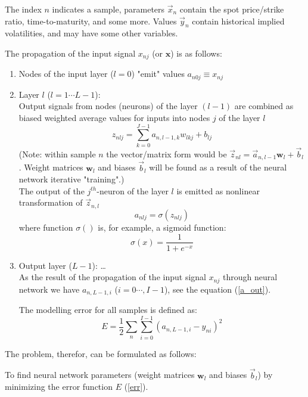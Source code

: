 \documentclass[10pt]{article}
\begin{document}
The index $n$ indicates a sample, parameters $\vec x_n$ contain the spot price/strike ratio, time-to-maturity, and some more. Values $\vec y_n$ contain historical implied volatilities, and may have some other variables. 

The propagation of the input signal $x_{nj}$ (or $\textbf{x}$) is as follows:
\begin{enumerate}
\item Nodes of the input layer ($l=0$) "emit" values $a_{n0j} \equiv x_{nj} $
\item Layer $l$ ($l=1\cdots L-1$): \\
Output signals from nodes (neurons) of the layer $(l-1)$ are combined as biased weighted average values for inputs into nodes $j$ of the layer $l$
 \begin{equation}
 \label{zab}
z_{nlj} = \sum_{k=0}^{J-1} a_{n,l-1,k}w_{lkj} + b_{lj}
\end{equation}
(Note: within sample $n$ the vector/matrix form would be $\vec{z}_{nl} = \vec{a}_{n,l-1}\textbf{w}_l + \vec {b}_l$. 
Weight matrices $\textbf{w}_l$ and biases $\vec {b}_l$ will be found as a result of the neural network iterative "training".)\\
The output of the $j^{th}$-neuron of the layer $l$ is emitted as nonlinear transformation of  $\vec{z}_{n,l} $ 
\begin{equation}
\label{a_out}
a_{nlj} = \sigma(z_{nlj})
\end{equation}
where function $\sigma()$ is, for example, a sigmoid function:
\begin{equation}
\sigma(x) = \frac{1}{1+ e^{-x}}
\end{equation}
\item Output layer ($L-1$): \ldots \\
As the result of the propagation of the input signal $x_{nj}$ through neural network we have $a_{n,L-1,i}$ ($i=0 \cdots , I-1$), see the equation (\ref{a_out}). 

The modelling error for all samples is defined as:
\begin{equation}
\label{err}
E = \frac{1}{2}\sum_n \sum_{i=0}^{I-1} (a_{n,L-1,i} - y_{ni})^2
\end{equation}
\end{enumerate} 

The problem, therefor, can be formulated as follows: \\

\begin{tcolorbox}
To find neural network parameters (weight matrices $\textbf{w}_l$ and biases $\vec {b}_l$) by minimizing the error function $E$ (\ref{err}).
\end{tcolorbox}
\end{document}
